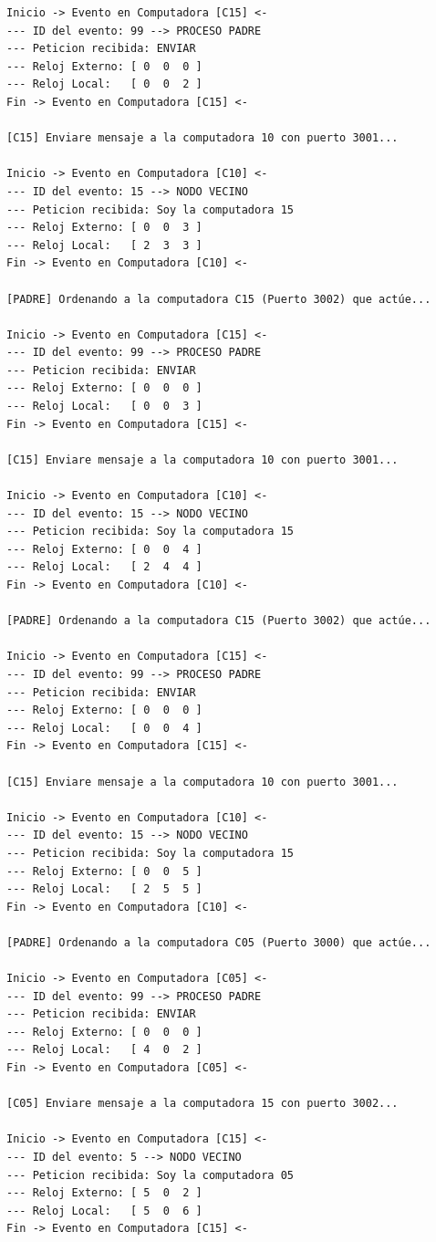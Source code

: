 \begin{lstlisting}[style=estiloC]
Inicio -> Evento en Computadora [C15] <-
--- ID del evento: 99 --> PROCESO PADRE
--- Peticion recibida: ENVIAR
--- Reloj Externo: [ 0  0  0 ]
--- Reloj Local:   [ 0  0  2 ]
Fin -> Evento en Computadora [C15] <-

[C15] Enviare mensaje a la computadora 10 con puerto 3001...

Inicio -> Evento en Computadora [C10] <-
--- ID del evento: 15 --> NODO VECINO
--- Peticion recibida: Soy la computadora 15
--- Reloj Externo: [ 0  0  3 ]
--- Reloj Local:   [ 2  3  3 ]
Fin -> Evento en Computadora [C10] <-

[PADRE] Ordenando a la computadora C15 (Puerto 3002) que actúe...

Inicio -> Evento en Computadora [C15] <-
--- ID del evento: 99 --> PROCESO PADRE
--- Peticion recibida: ENVIAR
--- Reloj Externo: [ 0  0  0 ]
--- Reloj Local:   [ 0  0  3 ]
Fin -> Evento en Computadora [C15] <-

[C15] Enviare mensaje a la computadora 10 con puerto 3001...

Inicio -> Evento en Computadora [C10] <-
--- ID del evento: 15 --> NODO VECINO
--- Peticion recibida: Soy la computadora 15
--- Reloj Externo: [ 0  0  4 ]
--- Reloj Local:   [ 2  4  4 ]
Fin -> Evento en Computadora [C10] <-

[PADRE] Ordenando a la computadora C15 (Puerto 3002) que actúe...

Inicio -> Evento en Computadora [C15] <-
--- ID del evento: 99 --> PROCESO PADRE
--- Peticion recibida: ENVIAR
--- Reloj Externo: [ 0  0  0 ]
--- Reloj Local:   [ 0  0  4 ]
Fin -> Evento en Computadora [C15] <-

[C15] Enviare mensaje a la computadora 10 con puerto 3001...

Inicio -> Evento en Computadora [C10] <-
--- ID del evento: 15 --> NODO VECINO
--- Peticion recibida: Soy la computadora 15
--- Reloj Externo: [ 0  0  5 ]
--- Reloj Local:   [ 2  5  5 ]
Fin -> Evento en Computadora [C10] <-

[PADRE] Ordenando a la computadora C05 (Puerto 3000) que actúe...

Inicio -> Evento en Computadora [C05] <-
--- ID del evento: 99 --> PROCESO PADRE
--- Peticion recibida: ENVIAR
--- Reloj Externo: [ 0  0  0 ]
--- Reloj Local:   [ 4  0  2 ]
Fin -> Evento en Computadora [C05] <-

[C05] Enviare mensaje a la computadora 15 con puerto 3002...

Inicio -> Evento en Computadora [C15] <-
--- ID del evento: 5 --> NODO VECINO
--- Peticion recibida: Soy la computadora 05
--- Reloj Externo: [ 5  0  2 ]
--- Reloj Local:   [ 5  0  6 ]
Fin -> Evento en Computadora [C15] <-


\end{lstlisting}
